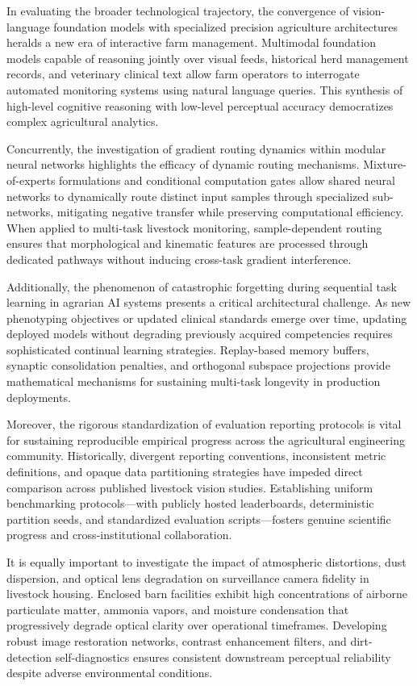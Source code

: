 \documentclass[Times,12pt,oneside,openany,print,index]{report}
\begin{document}
In evaluating the broader technological trajectory, the convergence of vision-language foundation models with specialized precision agriculture architectures heralds a new era of interactive farm management. Multimodal foundation models capable of reasoning jointly over visual feeds, historical herd management records, and veterinary clinical text allow farm operators to interrogate automated monitoring systems using natural language queries. This synthesis of high-level cognitive reasoning with low-level perceptual accuracy democratizes complex agricultural analytics.

Concurrently, the investigation of gradient routing dynamics within modular neural networks highlights the efficacy of dynamic routing mechanisms. Mixture-of-experts formulations and conditional computation gates allow shared neural networks to dynamically route distinct input samples through specialized sub-networks, mitigating negative transfer while preserving computational efficiency. When applied to multi-task livestock monitoring, sample-dependent routing ensures that morphological and kinematic features are processed through dedicated pathways without inducing cross-task gradient interference.

Additionally, the phenomenon of catastrophic forgetting during sequential task learning in agrarian AI systems presents a critical architectural challenge. As new phenotyping objectives or updated clinical standards emerge over time, updating deployed models without degrading previously acquired competencies requires sophisticated continual learning strategies. Replay-based memory buffers, synaptic consolidation penalties, and orthogonal subspace projections provide mathematical mechanisms for sustaining multi-task longevity in production deployments.

Moreover, the rigorous standardization of evaluation reporting protocols is vital for sustaining reproducible empirical progress across the agricultural engineering community. Historically, divergent reporting conventions, inconsistent metric definitions, and opaque data partitioning strategies have impeded direct comparison across published livestock vision studies. Establishing uniform benchmarking protocols—with publicly hosted leaderboards, deterministic partition seeds, and standardized evaluation scripts—fosters genuine scientific progress and cross-institutional collaboration.

It is equally important to investigate the impact of atmospheric distortions, dust dispersion, and optical lens degradation on surveillance camera fidelity in livestock housing. Enclosed barn facilities exhibit high concentrations of airborne particulate matter, ammonia vapors, and moisture condensation that progressively degrade optical clarity over operational timeframes. Developing robust image restoration networks, contrast enhancement filters, and dirt-detection self-diagnostics ensures consistent downstream perceptual reliability despite adverse environmental conditions.
\end{document}
